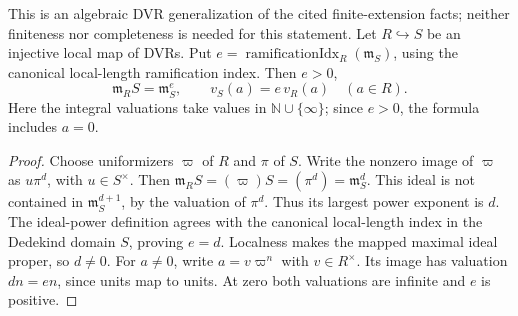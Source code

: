 \begin{lemma}
\label{fw:ramification-index-scaling}
\leanok
This is an algebraic DVR generalization of the cited finite-extension
facts; neither finiteness nor completeness is needed for this statement.
Let $R\hookrightarrow S$ be an injective local map of DVRs. Put
$e=\operatorname{ramificationIdx}_R(\mathfrak m_S)$, using the canonical
local-length ramification index. Then $e>0$,
\[
 \mathfrak m_RS=\mathfrak m_S^e,\qquad
 v_S(a)=e\,v_R(a)\quad(a\in R).
\]
Here the integral valuations take values in $\mathbb N\cup\{\infty\}$;
since $e>0$, the formula includes $a=0$.
\end{lemma}
\begin{proof}
Choose uniformizers $\varpi$ of $R$ and $\pi$ of $S$. Write the nonzero
image of $\varpi$ as $u\pi^d$, with $u\in S^\times$. Then
$\mathfrak m_RS=(\varpi)S=(\pi^d)=\mathfrak m_S^d$. This ideal is
not contained in $\mathfrak m_S^{d+1}$, by the valuation of $\pi^d$.
Thus its largest power exponent is $d$. The ideal-power definition
agrees with the canonical local-length index in the Dedekind domain
$S$, proving $e=d$. Localness makes the mapped maximal ideal proper,
so $d\ne0$. For $a\ne0$, write $a=v\varpi^n$ with $v\in R^\times$.
Its image has valuation $dn=en$, since units map to units. At zero
both valuations are infinite and $e$ is positive.
\end{proof}


